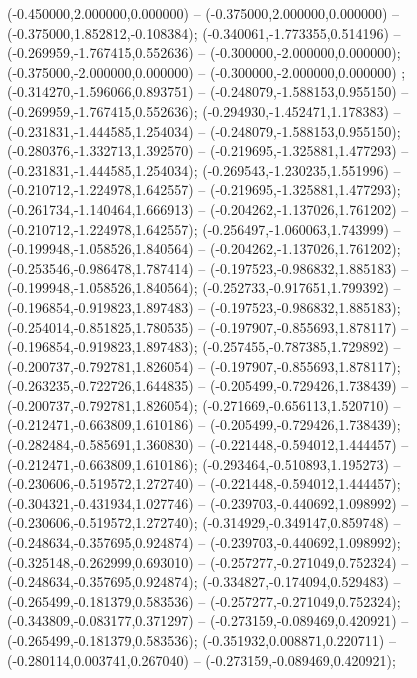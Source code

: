  (-0.450000,2.000000,0.000000) -- (-0.375000,2.000000,0.000000) -- (-0.375000,1.852812,-0.108384);
 (-0.340061,-1.773355,0.514196) -- (-0.269959,-1.767415,0.552636) -- (-0.300000,-2.000000,0.000000);
 (-0.375000,-2.000000,0.000000) -- (-0.300000,-2.000000,0.000000) ;
 (-0.314270,-1.596066,0.893751) -- (-0.248079,-1.588153,0.955150) -- (-0.269959,-1.767415,0.552636);
 (-0.294930,-1.452471,1.178383) -- (-0.231831,-1.444585,1.254034) -- (-0.248079,-1.588153,0.955150);
 (-0.280376,-1.332713,1.392570) -- (-0.219695,-1.325881,1.477293) -- (-0.231831,-1.444585,1.254034);
 (-0.269543,-1.230235,1.551996) -- (-0.210712,-1.224978,1.642557) -- (-0.219695,-1.325881,1.477293);
 (-0.261734,-1.140464,1.666913) -- (-0.204262,-1.137026,1.761202) -- (-0.210712,-1.224978,1.642557);
 (-0.256497,-1.060063,1.743999) -- (-0.199948,-1.058526,1.840564) -- (-0.204262,-1.137026,1.761202);
 (-0.253546,-0.986478,1.787414) -- (-0.197523,-0.986832,1.885183) -- (-0.199948,-1.058526,1.840564);
 (-0.252733,-0.917651,1.799392) -- (-0.196854,-0.919823,1.897483) -- (-0.197523,-0.986832,1.885183);
 (-0.254014,-0.851825,1.780535) -- (-0.197907,-0.855693,1.878117) -- (-0.196854,-0.919823,1.897483);
 (-0.257455,-0.787385,1.729892) -- (-0.200737,-0.792781,1.826054) -- (-0.197907,-0.855693,1.878117);
 (-0.263235,-0.722726,1.644835) -- (-0.205499,-0.729426,1.738439) -- (-0.200737,-0.792781,1.826054);
 (-0.271669,-0.656113,1.520710) -- (-0.212471,-0.663809,1.610186) -- (-0.205499,-0.729426,1.738439);
 (-0.282484,-0.585691,1.360830) -- (-0.221448,-0.594012,1.444457) -- (-0.212471,-0.663809,1.610186);
 (-0.293464,-0.510893,1.195273) -- (-0.230606,-0.519572,1.272740) -- (-0.221448,-0.594012,1.444457);
 (-0.304321,-0.431934,1.027746) -- (-0.239703,-0.440692,1.098992) -- (-0.230606,-0.519572,1.272740);
 (-0.314929,-0.349147,0.859748) -- (-0.248634,-0.357695,0.924874) -- (-0.239703,-0.440692,1.098992);
 (-0.325148,-0.262999,0.693010) -- (-0.257277,-0.271049,0.752324) -- (-0.248634,-0.357695,0.924874);
 (-0.334827,-0.174094,0.529483) -- (-0.265499,-0.181379,0.583536) -- (-0.257277,-0.271049,0.752324);
 (-0.343809,-0.083177,0.371297) -- (-0.273159,-0.089469,0.420921) -- (-0.265499,-0.181379,0.583536);
 (-0.351932,0.008871,0.220711) -- (-0.280114,0.003741,0.267040) -- (-0.273159,-0.089469,0.420921);
